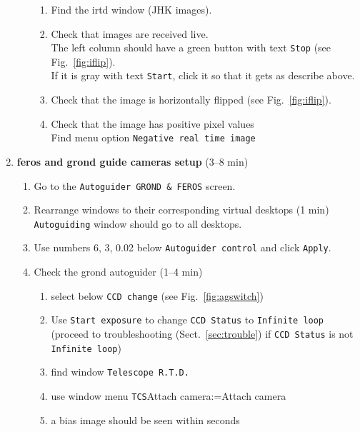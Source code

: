 \documentclass[11pt,fleqn]{book} %
\makeatletter
\def\menu#1#2{\texttt{#1}\ifx{}#2\else\@for\@x:=#2\do{$\rightarrow$\texttt{\@x}}\fi}
\def\wmenu#1#2{window menu \menu{#1}{#2}}
\makeatother
\begin{document}
\begin{enumerate}
\begin{enumerate}
\begin{enumerate}
               \item Find the irtd window (JHK images).               
               \item Check that images are received live.\\
                     The left column should have a green button with text \texttt{Stop} (see Fig.~\ref{fig:iflip}).\\
                     If it is gray with text \texttt{Start}, click it so that it gets as describe above.
              \item Check that the image is horizontally flipped (see Fig.~\ref{fig:iflip}).
              \item Check that the image has positive pixel values\\
                    Find menu option \texttt{Negative real time image}
             \end{enumerate}
        \end{enumerate}
  \item \textbf{\gls{feros} and \gls{grond} guide cameras setup} (3--8 min)\label{list:ag}
        \begin{enumerate}
           \item Go to the \texttt{Autoguider GROND \& FEROS} screen. 
           \item Rearrange windows to their corresponding virtual desktops (1 min)\\
                 \texttt{Autoguiding} window should go to all desktops.
           \item Use numbers 6, 3, 0.02 below \texttt{Autoguider control} and click \texttt{Apply}.
           \item Check the \gls{grond} autoguider (1--4 min)
               \begin{enumerate}
                  \item select  below \texttt{CCD change} (see Fig.~\ref{fig:agswitch})
                  \item Use \texttt{Start exposure} to change \texttt{CCD Status} to \texttt{Infinite loop}\\
                  (proceed to troubleshooting (Sect.~\ref{sec:trouble}) if \texttt{CCD Status} is not \texttt{Infinite loop})
                  \item find window \texttt{Telescope R.T.D.}
                  \item use \wmenu{TCS}{Attach camera}
                  \item a bias image should be seen within seconds

\end{enumerate}
\end{enumerate}
\end{enumerate}
\end{document}
